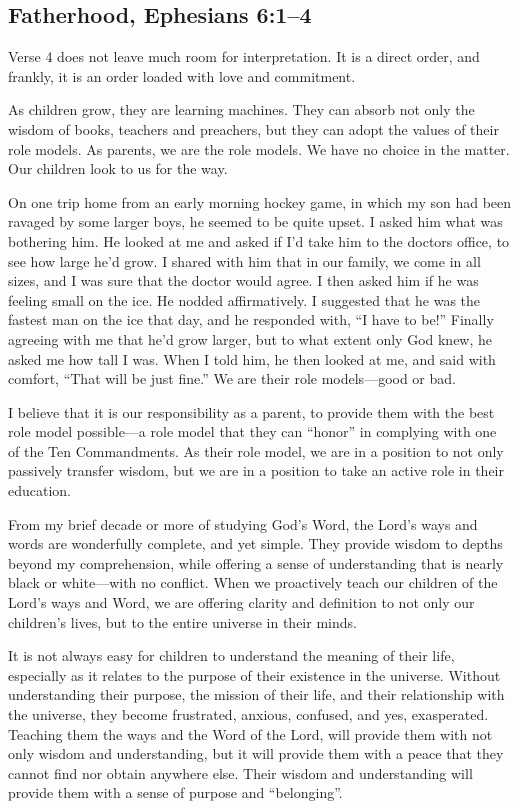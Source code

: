 \documentclass[12pt]{memoir}
\begin{document}
\subsection[Fatherhood]{Fatherhood, Ephesians 6:1--4}

Verse 4 does not leave much room for interpretation. It is a direct
order, and frankly, it is an order loaded with love and commitment.

As children grow, they are learning machines. They can absorb not
only the wisdom of books, teachers and preachers, but they can adopt
the values of their role models. As parents, we are the role models.
We have no choice in the matter. Our children look to us for the way.

On one trip home from an early morning hockey game, in which my son
had been ravaged by some larger boys, he seemed to be quite upset.
I asked him what was bothering him. He looked at me and asked if I'd
take him to the doctors office, to see how large he'd grow. I shared
with him that in our family, we come in all sizes, and I was sure
that the doctor would agree. I then asked him if he was feeling small
on the ice. He nodded affirmatively. I suggested that he was the fastest
man on the ice that day, and he responded with, ``I have to be!''
Finally agreeing with me that he'd grow larger, but to what extent
only God knew, he asked me how tall I was. When I told him, he then
looked at me, and said with comfort, ``That will be just fine.''
We are their role models---good or bad.

I believe that it is our responsibility as a parent, to provide them
with the best role model possible---a role model that they can ``honor''
in complying with one of the Ten Commandments. As their role model,
we are in a position to not only passively transfer wisdom, but we
are in a position to take an active role in their education.

From my brief decade or more of studying God's Word, the Lord's ways
and words are wonderfully complete, and yet simple. They provide wisdom
to depths beyond my comprehension, while offering a sense of understanding
that is nearly black or white---with no conflict. When we proactively
teach our children of the Lord's ways and Word, we are offering clarity
and definition to not only our children's lives, but to the entire
universe in their minds.

It is not always easy for children to understand the meaning of their
life, especially as it relates to the purpose of their existence in
the universe. Without understanding their purpose, the mission of
their life, and their relationship with the universe, they become
frustrated, anxious, confused, and yes, exasperated. Teaching them
the ways and the Word of the Lord, will provide them with not only
wisdom and understanding, but it will provide them with a peace that
they cannot find nor obtain anywhere else. Their wisdom and understanding
will provide them with a sense of purpose and ``belonging''.
\end{document}
